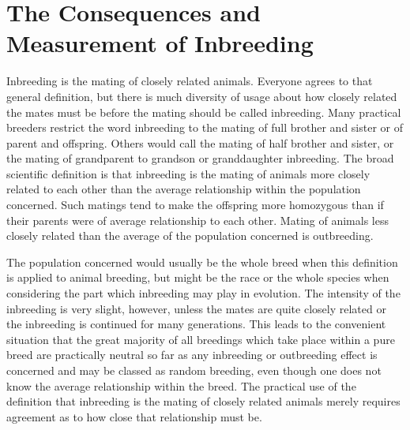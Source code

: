 \chapter{The Consequences and Measurement of Inbreeding}
\label{cha:Lush_Chapter_21}

Inbreeding is the mating of closely related animals. Everyone agrees
to that general definition, but there is much diversity of usage about
how closely related the mates must be before the mating should be
called inbreeding. Many practical breeders restrict the word inbreeding
to the mating of full brother and sister or of parent and offspring. Others
would call the mating of half brother and sister, or the mating of
grandparent to grandson or granddaughter inbreeding. The broad
scientific definition is that inbreeding is the mating of animals more
closely related to each other than the average relationship within the
population concerned. Such matings tend to make the offspring more
homozygous than if their parents were of average relationship to each
other. Mating of animals less closely related than the average of the
population concerned is outbreeding.

The population concerned would usually be the whole breed when
this definition is applied to animal breeding, but might be the race or
the whole species when considering the part which inbreeding may
play in evolution. The intensity of the inbreeding is very slight, however,
unless the mates are quite closely related or the inbreeding is continued
for many generations. This leads to the convenient situation
that the great majority of all breedings which take place within a pure
breed are practically neutral so far as any inbreeding or outbreeding
effect is concerned and may be classed as random breeding, even though
one does not know the average relationship within the breed. The practical
use of the definition that inbreeding is the mating of closely related
animals merely requires agreement as to how close that relationship
must be.

